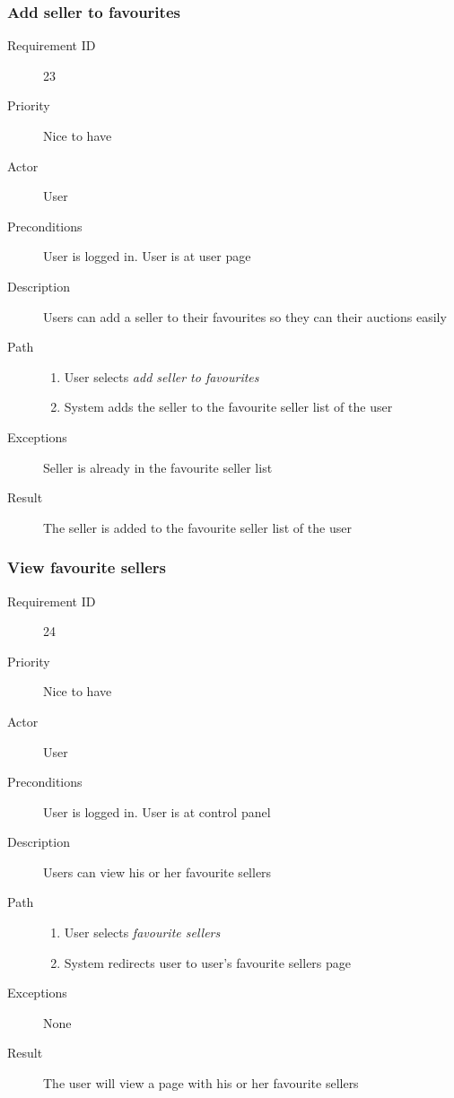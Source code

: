 		\subsubsection{Add seller to favourites}
			\begin{description}
				\item[Requirement ID] 23
				\item[Priority] Nice to have
				\item[Actor] User
				\item[Preconditions] User is logged in. User is at user page
				\item[Description] Users can add a seller to their favourites so they can their auctions easily
				\item[Path]
 					\begin{enumerate}
						\item User selects \emph{add seller to favourites}
						\item System adds the seller to the favourite seller list of the user
					\end{enumerate}
				\item[Exceptions] Seller is already in the favourite seller list
				\item[Result] The seller is added to the favourite seller list of the user
			\end{description}
		\subsubsection{View favourite sellers}
			\begin{description}
				\item[Requirement ID] 24
				\item[Priority] Nice to have
				\item[Actor] User
				\item[Preconditions] User is logged in. User is at control panel
				\item[Description] Users can view his or her favourite sellers
				\item[Path]
 					\begin{enumerate}
						\item User selects \emph{favourite sellers}
						\item System redirects user to user's favourite sellers page
					\end{enumerate}
				\item[Exceptions] None
				\item[Result] The user will view a page with his or her favourite sellers
			\end{description}
